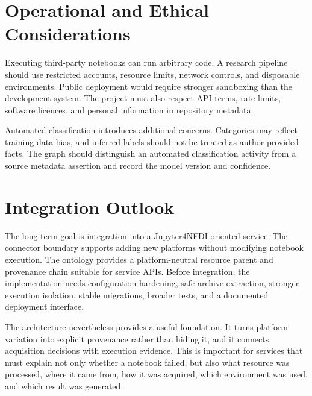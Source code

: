\section{Operational and Ethical Considerations}

Executing third-party notebooks can run arbitrary code. A research pipeline should use restricted accounts, resource limits, network controls, and disposable environments. Public deployment would require stronger sandboxing than the development system. The project must also respect API terms, rate limits, software licences, and personal information in repository metadata.

Automated classification introduces additional concerns. Categories may reflect training-data bias, and inferred labels should not be treated as author-provided facts. The graph should distinguish an automated classification activity from a source metadata assertion and record the model version and confidence.

\section{Integration Outlook}

The long-term goal is integration into a Jupyter4NFDI-oriented service. The connector boundary supports adding new platforms without modifying notebook execution. The ontology provides a platform-neutral resource parent and provenance chain suitable for service APIs. Before integration, the implementation needs configuration hardening, safe archive extraction, stronger execution isolation, stable migrations, broader tests, and a documented deployment interface.

The architecture nevertheless provides a useful foundation. It turns platform variation into explicit provenance rather than hiding it, and it connects acquisition decisions with execution evidence. This is important for services that must explain not only whether a notebook failed, but also what resource was processed, where it came from, how it was acquired, which environment was used, and which result was generated.

